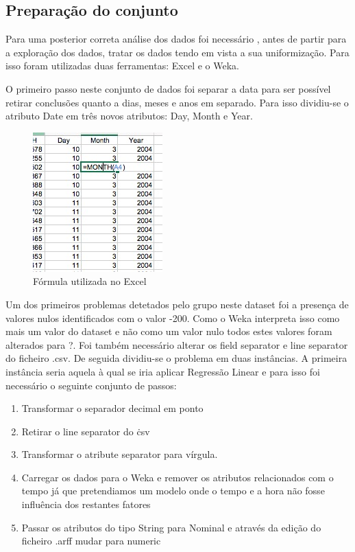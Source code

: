 \subsection{Preparação do conjunto}

Para uma posterior correta análise dos dados foi necessário , antes de partir para a exploração dos dados, tratar os dados tendo em vista a sua uniformização. Para isso foram utilizadas duas ferramentas: Excel e o Weka.

O primeiro passo neste conjunto de dados foi separar a data para ser possível retirar conclusões quanto a dias, meses e anos em separado. Para isso dividiu-se o atributo Date em três novos atributos: Day, Month e Year.

\begin{figure}[H]
    \centering
    \includegraphics[scale=1]{tex/img/img1.jpg}
    \caption{Fórmula utilizada no Excel}
    \label{fig:Novos Atributos}
\end{figure}


Um dos primeiros problemas detetados pelo grupo neste dataset foi a presença de valores nulos identificados com o valor -200. Como o Weka interpreta isso como mais um valor do dataset e não como um valor nulo todos estes valores foram alterados para ?. Foi também necessário alterar os field separator e line separator do ficheiro .csv.
De seguida dividiu-se o problema em duas instâncias. A primeira instância seria aquela à qual se iria aplicar Regressão Linear e para isso foi necessário o seguinte conjunto de passos:

\begin{enumerate}
	\item Transformar o separador decimal em ponto
	\item Retirar o line separator do \.csv
	\item Transformar o atribute separator para vírgula.
	\item Carregar os dados para o Weka e remover os atributos relacionados com o tempo já que pretendiamos um modelo onde o tempo e a hora não fosse influência dos restantes fatores
	\item Passar os atributos do tipo String para Nominal e através da edição do ficheiro .arff mudar para numeric
\end{enumerate}

